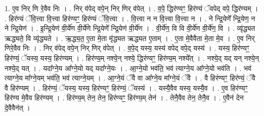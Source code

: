 \documentclass[17pt]{extarticle}
\begin{document}
1. ए॒व निर् णि रे॒वैव निः । . निर् व॑पेद् वपे॒न् निर् णिर् व॑पेत् । . व॒पे॒ द्धिर॑ण्यꣳ॒॒ हिर॑ण्यं ॅवपेद् वपे॒ द्धिर॑ण्यम् । . हिर॑ण्यं ॅवि॒त्त्वा वि॒त्त्वा हिर॑ण्यꣳ॒॒ हिर॑ण्यं ॅवि॒त्त्वा । . वि॒त्त्वा न न वि॒त्त्वा वि॒त्त्वा न । . ने न्द्रि॒येणे᳚ न्द्रि॒येण॒ न ने न्द्रि॒येण॑ । . इ॒न्द्रि॒येण॑ वी॒र्ये॑ण वी॒र्ये॑णे न्द्रि॒येणे᳚ न्द्रि॒येण॑ वी॒र्ये॑ण । . वी॒र्ये॑ण॒ वि वि वी॒र्ये॑ण वी॒र्ये॑ण॒ वि । . व्यृ॑द्ध्यत ऋद्ध्यते॒ वि व्यृ॑द्ध्यते । . ऋ॒द्ध्य॒त॒ ए॒ता मे॒ता मृ॑द्ध्यत ऋद्ध्यत ए॒ताम् । . ए॒ता मे॒वैवैता मे॒ता मे॒व । . ए॒व निर् णिरे॒वैव निः । . निर् व॑पेद् वपे॒न् निर् णिर् व॑पेत् । . व॒पे॒द् यस्य॒ यस्य॑ वपेद् वपे॒द् यस्य॑ । . यस्य॒ हिर॑ण्यꣳ॒॒ हिर॑ण्यं॒ ॅयस्य॒ यस्य॒ हिर॑ण्यम् । . हिर॑ण्य॒म् नश्ये॒न् नश्ये॒ द्धिर॑ण्यꣳ॒॒ हिर॑ण्य॒म् नश्ये᳚त् । . नश्ये॒द् यद् यन् नश्ये॒न् नश्ये॒द् यत् । . यदा᳚ग्ने॒य आ᳚ग्ने॒यो यद् यदा᳚ग्ने॒यः । . आ॒ग्ने॒यो भव॑ति॒ भव॑ त्याग्ने॒य आ᳚ग्ने॒यो भव॑ति । . भव॑ त्याग्ने॒य मा᳚ग्ने॒यम् भव॑ति॒ भव॑ त्याग्ने॒यम् । . आ॒ग्ने॒यं ॅवै वा आ᳚ग्ने॒य मा᳚ग्ने॒यं ॅवै । . वै हिर॑ण्यꣳ॒॒ हिर॑ण्यं॒ ॅवै वै हिर॑ण्यम् । . हिर॑ण्यं॒ ॅयस्य॒ यस्य॒ हिर॑ण्यꣳ॒॒ हिर॑ण्यं॒ ॅयस्य॑ । . यस्यै॒वैव यस्य॒ यस्यै॒व । . ए॒व हिर॑ण्यꣳ॒॒ हिर॑ण्य मे॒वैव हिर॑ण्यम् । . हिर॑ण्य॒म् तेन॒ तेन॒ हिर॑ण्यꣳ॒॒ हिर॑ण्य॒म् तेन॑ । . तेनै॒वैव तेन॒ तेनै॒व । . ए॒वैन॑ देन दे॒वैवैन॑त् । \newline
\end{document}
